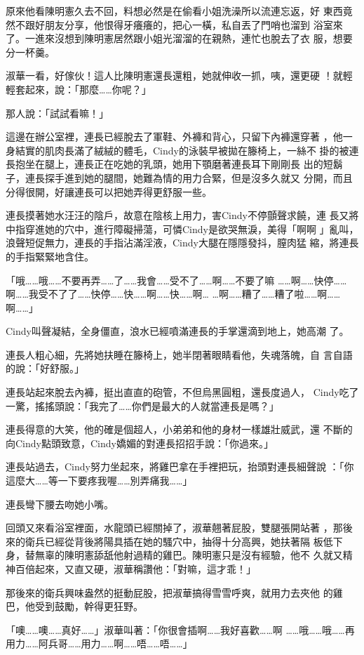 原來他看陳明憲久去不回，料想必然是在偷看小姐洗澡所以流連忘返，好
東西竟然不跟好朋友分享，他恨得牙癢癢的，把心一橫，私自丟了門哨也溜到
浴室來了。一進來沒想到陳明憲居然跟小姐光溜溜的在親熱，連忙也脫去了衣
服，想要分一杯羹。

淑華一看，好傢伙！這人比陳明憲還長還粗，她就伸收一抓，咦，還更硬
！就輕輕套起來，說：「那麼……你呢？」

那人說：「試試看嘛！」

這邊在辦公室裡，連長已經脫去了軍鞋、外褲和背心，只留下內褲還穿著
，他一身結實的肌肉長滿了絨絨的體毛，Cindy的泳裝早被拋在籐椅上，一絲不
掛的被連長抱坐在腿上，連長正在吃她的乳頭，她用下顎磨著連長耳下剛剛長
出的短鬍子，連長探手進到她的腿間，她難為情的用力合緊，但是沒多久就又
分開，而且分得很開，好讓連長可以把她弄得更舒服一些。

連長摸著她水汪汪的陰戶，故意在陰核上用力，害Cindy不停顫聲求饒，連
長又將中指穿進她的穴中，進行障礙掃蕩，可憐Cindy是欲哭無淚，美得「啊啊
」亂叫，浪聲短促無力，連長的手指沾滿淫液，Cindy大腿在隱隱發抖，膣肉猛
縮，將連長的手指緊緊地含住。

「哦……哦……不要再弄……了……我會……受不了……啊……不要了嘛
……啊……快停……啊……我受不了了……快停……快……啊……快……啊…
…啊……糟了……糟了啦……啊……啊……」

Cindy叫聲凝結，全身僵直，浪水已經噴滿連長的手掌還滴到地上，她高潮
了。

連長人粗心細，先將她扶睡在籐椅上，她半閉著眼睛看他，失魂落魄，自
言自語的說：「好舒服。」

連長站起來脫去內褲，挺出直直的砲管，不但烏黑圓粗，還長度過人，
Cindy吃了一驚，搖搖頭說：「我完了……你們是最大的人就當連長是嗎？」

連長得意的大笑，他的確是個超人，小弟弟和他的身材一樣雄壯威武，還
不斷的向Cindy點頭致意，Cindy嬌媚的對連長招招手說：「你過來。」

連長站過去，Cindy努力坐起來，將雞巴拿在手裡把玩，抬頭對連長細聲說
：「你這麼大……等一下要疼我喔……別弄痛我……」

連長彎下腰去吻她小嘴。

回頭又來看浴室裡面，水龍頭已經關掉了，淑華翹著屁股，雙腿張開站著
，那後來的衛兵已經從背後將陽具插在她的騷穴中，抽得十分高興，她扶著隔
板低下身，替無辜的陳明憲舔舐他射過精的雞巴。陳明憲只是沒有經驗，他不
久就又精神百倍起來，又直又硬，淑華稱讚他：「對嘛，這才乖！」

那後來的衛兵興味盎然的挺動屁股，把淑華搞得雪雪呼爽，就用力去夾他
的雞巴，他受到鼓勵，幹得更狂野。

「噢……噢……真好……」淑華叫著：「你很會插啊……我好喜歡……啊
……哦……哦……再用力……阿兵哥……用力……啊……唔……唔……」

